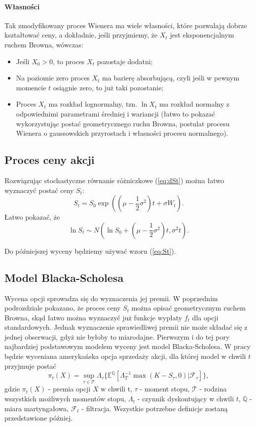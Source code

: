 \documentclass[12pt]{article}
\begin{document}
\paragraph{Własności} Tak zmodyfikowany proces Wienera ma wiele własności, które pozwalają dobrze kształtować ceny, a dokładnie, jeśli przyjmiemy, że $X_t$ jest eksponencjalnym ruchem Browna, wówczas:
\begin{itemize}
\item Jeśli $X_0 > 0$, to proces $X_t$ pozostaje dodatni;
\item Na poziomie zero proces $X_t$ ma barierę absorbującą, czyli jeśli w pewnym momencie $t$ osiągnie zero, to już taki pozostanie;
\item Proces $X_t$ ma rozkład lognormalny, tzn. $\ln X_t$ ma rozkład normalny z odpowiednimi parametrami średniej i wariancji (łatwo to pokazać wykorzystując postać geometrycznego ruchu Browna, postulat procesu Wienera o gaussowskich przyrostach i własności procesu normalnego).
\end{itemize}

\subsection{Proces ceny akcji}

Rozwiązując stochastyczne równanie różniczkowe (\ref{eq:dSt}) można łatwo wyznaczyć postać ceny $S_t$:
\begin{equation}
\label{eq:St}
S_t = S_0 \exp((\mu - \frac{1}{2}\sigma^2)t + \sigma W_t).
\end{equation}
Łatwo pokazać, że 
\begin{equation}
\label{eq:rozklad}
\ln S_t \sim N(\ln S_0 + (\mu-\frac{1}{2}\sigma^2)t, \sigma^2 t).
\end{equation}

\noindent Do późniejszej wyceny będziemy używać wzoru (\ref{eq:St}).

\subsection{Model Blacka-Scholesa}
Wycena opcji sprowadza się do wyznaczenia jej premii. W poprzednim podrozdziale pokazano, że proces ceny $S_t$ można opisać geometrycznym ruchem Browna, skąd łatwo można wyznaczyć już funkcje wypłaty $f_t$ dla opcji standardowych. Jednak wyznaczenie sprawiedliwej premii nie może składać się z jednej obserwacji, gdyż nie byłoby to miarodajne. Pierwszym i do tej pory najbardziej podstawowym modelem wyceny jest model Blacka-Scholesa. W pracy będzie wyceniana amerykańska opcja sprzedaży akcji, dla której model w chwili $t$ przyjmuje postać
\begin{equation}
\label{eq:B-S}
\pi_t(X) = \sup_{\tau \in \mathcal{T}} \Lambda_{\tau}\{\mathbb{E}^{\mathbb{Q}}[\Lambda_{T}^{-1}\max(K-S_{\tau},0)|\mathcal{F}_{\tau}]\},
\end{equation}
gdzie $\pi_t(X)$ - premia opcji $X$ w chwili t, $\tau$ - moment stopu, $\mathcal{T}$ - rodzina wszystkich możliwych momentów stopu, $\Lambda_t$ - czynnik dyskontujący w chwili $t$, $\mathbb{Q}$ - miara martyngałowa, $\mathcal{F}_t$ - filtracja. Wszystkie potrzebne definicje zostaną przedstawione później.
\end{document}
